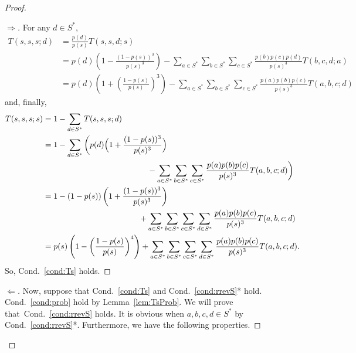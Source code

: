 \documentclass[10pt]{amsart}
\theoremstyle{definition}\newtheorem{defi}[theo]{Definition}\newtheorem{rema}[theo]{Remark}\newtheorem{exam}[theo]{Example}\newtheorem{exem}[theo]{Example}\newtheorem{nota}[theo]{Notation}
\newcounter{a}
\newcommand{\Cond}{Cond.}
\begin{document}
\begin{proof}
\begin{proof}[$\Rightarrow$]
For any $d \in S^*$,
\begin{align*}
T(s,s,s;d) & = \frac{p(d)}{p(s)} T(s,s,d;s) \\
& = p(d) \left(1 - \frac{(1-p(s))^3}{p(s)^3} \right) - \sum_{a \in S^*} \sum_{b \in S^*} \sum_{c \in S^*} \frac{p(b)p(c)p(d)}{p(s)^3}T(b,c,d;a)\\
& = p(d) \left(1 + \left(\frac{1-p(s)}{p(s)} \right)^3\right) - \sum_{a \in S^*} \sum_{b \in S^*} \sum_{c \in S^*} \frac{p(a)p(b)p(c)}{p(s)^3}T(a,b,c;d)
\end{align*}
and, finally,
\begingroup
\allowdisplaybreaks
\begin{align*}
T(s,s,s;s) & = 1 - \sum_{d \in S^*} T(s,s,s;d) \\*
& = 1 - \sum_{d \in S^*} \bigg(p(d) \Big(1 + \frac{(1-p(s))^3}{p(s)^3} \Big)\\*
&\mkern 235mu - \sum_{a \in S^*} \sum_{b \in S^*} \sum_{c \in S^*} \frac{p(a)p(b)p(c)}{p(s)^3}T(a,b,c;d) \bigg)\\
& = 1 - (1-p(s)) \left(1 + \frac{(1-p(s))^3}{p(s)^3} \right)\\*
&\mkern 215mu+ \sum_{a \in S^*} \sum_{b \in S^*} \sum_{c \in S^*} \sum_{d \in S^*} \frac{p(a)p(b)p(c)}{p(s)^3}T(a,b,c;d) \\
& = p(s) \left(1 - \left(\frac{1-p(s)}{p(s)} \right)^4 \right) + \sum_{a \in S^*} \sum_{b \in S^*} \sum_{c \in S^*} \sum_{d \in S^*} \frac{p(a)p(b)p(c)}{p(s)^3}T(a,b,c;d).
\end{align*}
\endgroup
So, \Cond~\ref{cond:Ts} holds.
\let\qed\relax
\end{proof}

\begin{proof}[$\Leftarrow$]
Now, suppose that \Cond~\ref{cond:Ts} and \Cond~\ref{cond:rrevS}* hold. \Cond~\ref{cond:prob} hold by Lemma~\ref{lem:TsProb}. We will prove that~\Cond~\ref{cond:rrevS} holds. It is obvious when $a,b,c,d \in S^*$ by \Cond~\ref{cond:rrevS}*. Furthermore, we have the following properties.


\end{proof}
\end{proof}
\end{document}
